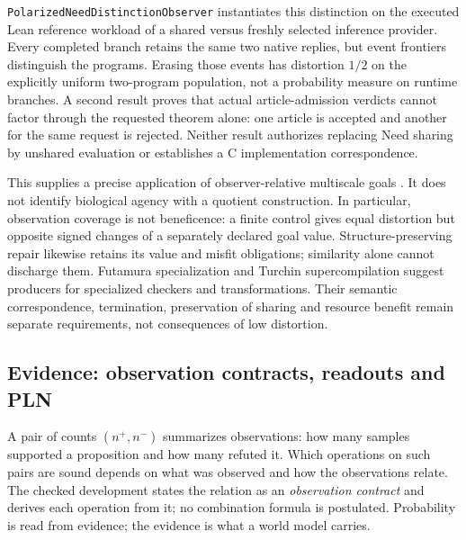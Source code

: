 \documentclass[11pt]{article}
\theoremstyle{definition}
\theoremstyle{remark}
\begin{document}
\nolinkurl{PolarizedNeedDistinctionObserver} instantiates this distinction
on the executed Lean reference workload of a shared versus freshly selected
inference provider. Every completed branch retains the same two native
replies, but event frontiers distinguish the programs. Erasing those events
has distortion $1/2$ on the explicitly uniform two-program population,
not a probability measure on runtime branches. A second result proves
that actual article-admission verdicts cannot factor through the requested
theorem alone: one article is accepted and another for the same request is
rejected. Neither result authorizes replacing Need sharing by unshared
evaluation or establishes a C implementation correspondence.

This supplies a precise application of observer-relative multiscale goals
\cite{FieldsLevinCompetency}. It does not identify biological agency with
a quotient construction. In particular, observation coverage is not
beneficence: a finite control gives equal distortion but opposite signed
changes of a separately declared goal value. Structure-preserving repair
likewise retains its value and misfit obligations; similarity alone cannot
discharge them. Futamura specialization and Turchin supercompilation
\cite{FutamuraRevisited,TurchinSupercompiler} suggest producers for
specialized checkers and transformations. Their semantic correspondence,
termination, preservation of sharing and resource benefit remain separate
requirements, not consequences of low distortion.

\subsection{Evidence: observation contracts, readouts and PLN}
\label{sec:evidence-contracts}

A pair of counts $(n^+,n^-)$ summarizes observations: how many samples
supported a proposition and how many refuted it.  Which operations on such
pairs are sound depends on what was observed and how the observations
relate.  The checked development states the relation as an
\emph{observation contract} and derives each operation from it; no
combination formula is postulated.  Probability is read from evidence; the
evidence is what a world model carries.
\end{document}
